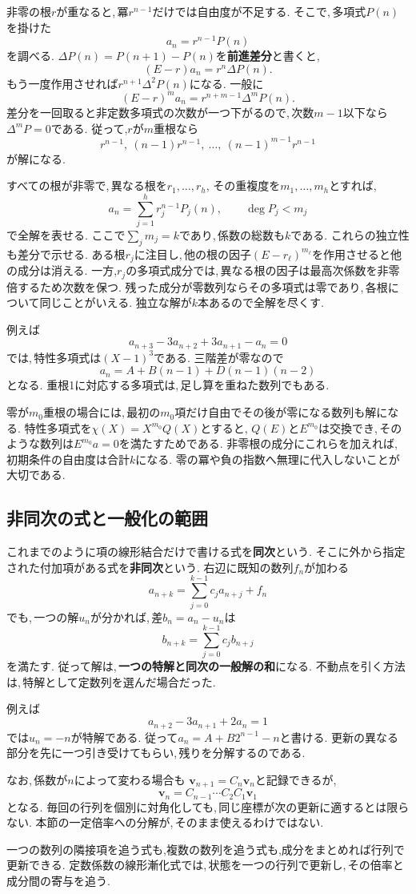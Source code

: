 非零の根$r$が重なると,\,冪$r^{n-1}$だけでは自由度が不足する.
そこで,\,多項式$P(n)$を掛けた
\[
 a_n=r^{n-1}P(n)
\]
を調べる. $\Delta P(n)=P(n+1)-P(n)$を\textbf{前進差分}と書くと,
\[
 (E-r)a_n=r^n\Delta P(n).
\]
もう一度作用させれば$r^{n+1}\Delta^2P(n)$になる.
一般に
\[
 (E-r)^m a_n=r^{n+m-1}\Delta^mP(n).
\]
差分を一回取ると非定数多項式の次数が一つ下がるので,\,次数$m-1$以下なら$\Delta^mP=0$である.
従って,$r$が$m$重根なら
\[
 r^{n-1},\ (n-1)r^{n-1},\ \ldots,\
 (n-1)^{m-1}r^{n-1}
\]
が解になる.

すべての根が非零で,\,異なる根を$r_1,\ldots,r_h$,
その重複度を$m_1,\ldots,m_h$とすれば,
\[
 a_n=\sum_{j=1}^{h}r_j^{n-1}P_j(n),
 \qquad \deg P_j<m_j
\]
で全解を表せる.
ここで$\sum_jm_j=k$であり,\,係数の総数も$k$である.
これらの独立性も差分で示せる.
ある根$r_j$に注目し,\,他の根の因子$(E-r_\ell)^{m_\ell}$を作用させると他の成分は消える.
一方,$r_j$の多項式成分では,\,異なる根の因子は最高次係数を非零倍するため次数を保つ.
残った成分が零数列ならその多項式は零であり,\,各根について同じことがいえる.
独立な解が$k$本あるので全解を尽くす.

例えば
\[
 a_{n+3}-3a_{n+2}+3a_{n+1}-a_n=0
\]
では,\,特性多項式は$(X-1)^3$である.
三階差が零なので
\[
 a_n=A+B(n-1)+D(n-1)(n-2)
\]
となる. 重根1に対応する多項式は,\,足し算を重ねた数列でもある.

零が$m_0$重根の場合には,\,最初の$m_0$項だけ自由でその後が零になる数列も解になる.
特性多項式を$\chi(X)=X^{m_0}Q(X)$とすると,
$Q(E)$と$E^{m_0}$は交換でき,\,そのような数列は$E^{m_0}a=0$を満たすためである.
非零根の成分にこれらを加えれば,\,初期条件の自由度は合計$k$になる.
零の冪や負の指数へ無理に代入しないことが大切である.

\subsection{非同次の式と一般化の範囲}

これまでのように項の線形結合だけで書ける式を\textbf{同次}という.
そこに外から指定された付加項がある式を\textbf{非同次}という.
右辺に既知の数列$f_n$が加わる
\[
 a_{n+k}=\sum_{j=0}^{k-1}c_j a_{n+j}+f_n
\]
でも,\,一つの解$u_n$が分かれば,\,差$b_n=a_n-u_n$は
\[
 b_{n+k}=\sum_{j=0}^{k-1}c_j b_{n+j}
\]
を満たす.
従って解は,\,\textbf{一つの特解と同次の一般解の和}になる.
不動点を引く方法は,\,特解として定数列を選んだ場合だった.

例えば
\[
 a_{n+2}-3a_{n+1}+2a_n=1
\]
では$u_n=-n$が特解である.
従って$a_n=A+B2^{n-1}-n$と書ける.
更新の異なる部分を先に一つ引き受けてもらい,\,残りを分解するのである.

なお,\,係数が$n$によって変わる場合も
$\boldsymbol v_{n+1}=C_n\boldsymbol v_n$と記録できるが,
\[
 \boldsymbol v_n=C_{n-1}\cdots C_2C_1\boldsymbol v_1
\]
となる. 毎回の行列を個別に対角化しても,\,同じ座標が次の更新に適するとは限らない.
本節の一定倍率への分解が,\,そのまま使えるわけではない.

\begin{bookpoint}
一つの数列の隣接項を追う式も,複数の数列を追う式も,成分をまとめれば行列で更新できる.
定数係数の線形漸化式では,\,状態を一つの行列で更新し,\,その倍率と成分間の寄与を追う.
\end{bookpoint}
